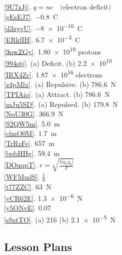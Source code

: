 \documentclass[main.tex]{subfiles}
\begin{document}
\ref{9U7zJj}. $q = n e \quad \text{(electron deficit)}$\\
\ref{gEsEJ7}. \qty{-0.8}{C}\\
\ref{d3zygU}. \SI{-8e-16}{C}\\
\ref{ERkfIH}. \SI{6.7e-3}{C}\\
\ref{9qwZGy}. \SI{1.80e19}{} protons\\
\ref{994stj}. (a) Deficit. \hspace{1em} (b) \SI{2.2e10}{}\\
\ref{IRX4Zr}. \SI{1.87e16}{} electrons\\
\ref{z4pMlx}. (a) Repulsive. \hspace{1em} (b) \SI{786.6}{N}\\
\ref{TPIAio}. (a) Attract. \hspace{1em} (b) \SI{786.6}{N}\\
\ref{mJu5SD}. (a) Repulsed. (b) \SI{179.8}{N}\\
\ref{NqU30G}. \SI{366.9}{N}\\
\ref{S2QW5m}. \SI{5.0}{m}\\
\ref{clmO0M}. \qty{1.7}{m}\\
\ref{TrRzFe}. \qty{657}{m}\\
\ref{bpbHHg}. \qty{59.4}{m}\\
\ref{DOuqpT}. $r = \sqrt{\frac{k |q_1 q_2|}{F}}$\\
\ref{WFMudS}. $\frac{1}{9}$\\
\ref{t77ZZC}. \SI{63}{N}\\
\ref{yCR62E}. \SI{1.3e-6}{N}\\
\ref{y5ONvE}. 0.07\\
\ref{sSztTO}. (a) 216 \hspace{1em} (b) \SI{2.1e-5}{N}\\


\clearpage
\printnoidxglossaries

\clearpage
\subsection*{Lesson Plans}
\end{document}
